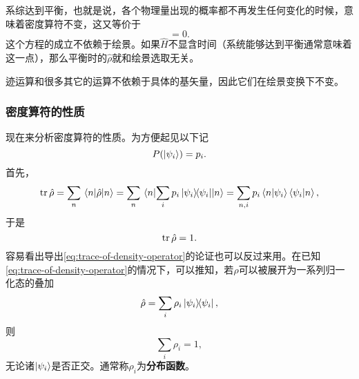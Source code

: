 \documentclass[hyperref, UTF8, a4paper]{ctexart}
\begin{document}
系综达到平衡，也就是说，各个物理量出现的概率都不再发生任何变化的时候，意味着密度算符不变，这又等价于
\begin{equation}
    [\hat{\rho}, \hat{H}] = 0.
    \label{eq:equilibrium-case}
\end{equation}
这个方程的成立不依赖于绘景。如果$\hat{H}$不显含时间（系统能够达到平衡通常意味着这一点），那么平衡时的$\hat{\rho}$就和绘景选取无关。

迹运算和很多其它的运算不依赖于具体的基矢量，因此它们在绘景变换下不变。

\subsubsection{密度算符的性质}

现在来分析密度算符的性质。为方便起见以下记
\[
    P(\ket{\psi_i}) = p_i.
\]
首先，
\[
    \trace \hat{\rho} = \sum_n \mel{n}{\hat{\rho}}{n} = \sum_n \mel{n}{\sum_i p_i \dyad{\psi_i}}{n} = \sum_{n, i} p_i \braket{n}{\psi_i} \braket{\psi_i}{n},
\]
于是
\begin{equation}
    \trace \hat{\rho} = 1.
    \label{eq:trace-of-density-operator}
\end{equation}
容易看出导出\eqref{eq:trace-of-density-operator}的论证也可以反过来用。在已知\eqref{eq:trace-of-density-operator}的情况下，可以推知，若$\hat{\rho}$可以被展开为一系列归一化态的叠加
\[
    \hat{\rho} = \sum_i \rho_i \dyad{\psi_i},
\]
则
\[
    \sum_i \rho_i = 1,
\]
无论诸$\ket{\psi_i}$是否正交。通常称$\rho_i$为\textbf{分布函数}。
\end{document}
